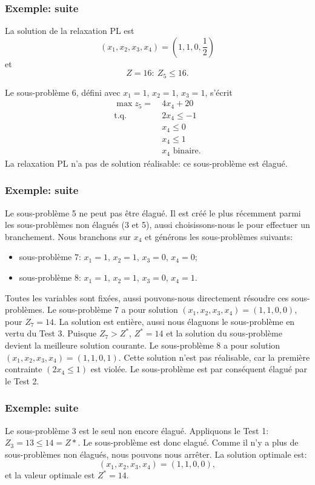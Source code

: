 \documentclass[usepdftitle=false]{beamer}
\def\st{\mbox{t.q. }}
\begin{document}
\begin{frame}
\frametitle{Exemple: suite}

La solution de la relaxation PL est
\[
( x_1, x_2, x_3, x_4) = \left(1,1,0, \frac{1}{2} \right)
\]
et
\[
Z = 16:\ Z_5 \leq 16.
\]

Le sous-problème 6, défini avec $x_1 = 1$, $x_2 = 1$, $x_3 = 1$, s'écrit
\begin{align*}
\max z_5 =\ & 4x_4 + 20 \\
\st{} & 2x_4 \leq -1 \\
& x_4 \leq 0 \\
& x_4 \leq 1 \\
& x_4 \mbox{ binaire}.
\end{align*}
La relaxation PL n'a pas de solution réalisable: ce sous-problème est élagué.

\end{frame}

\begin{frame}
\frametitle{Exemple: suite}

Le sous-problème 5 ne peut pas être élagué.
Il est créé le plus récemment parmi les sous-problèmes non élagués (3 et 5), aussi choisissons-nous le pour effectuer un branchement.
Nous branchons sur $x_4$ et générons les sous-problèmes suivants:
\begin{itemize}
\item
sous-problème 7: $x_1 = 1$, $x_2 = 1$, $x_3 = 0$, $x_4 = 0$;
\item
sous-problème 8: $x_1 = 1$, $x_2 = 1$, $x_3 = 0$, $x_4 = 1$.
\end{itemize}

\mbox{}

Toutes les variables sont fixées, aussi pouvons-nous directement résoudre ces sous-problèmes. 
Le sous-problème 7 a pour solution $(x_1, x_2, x_3, x_4) = (1, 1, 0, 0)$, pour $Z_7 = 14$.
La solution est entière, aussi nous élaguons le sous-problème en vertu du Test 3.
Puisque $Z_7 > Z^*$, $Z^* = 14$ et la solution du sous-problème devient la meilleure solution courante.
Le sous-problème 8 a pour solution $(x_1, x_2, x_3, x_4) = (1, 1, 0, 1)$.
Cette solution n'est pas réalisable, car la première contrainte $(2x_4 \leq 1)$ est violée.
Le sous-problème est par conséquent élagué par le Test 2.

\end{frame}

\begin{frame}
\frametitle{Exemple: suite}

Le sous-problème 3 est le seul non encore élagué.
Appliquons le Test 1: $Z_3 = 13 \leq 14 = Z*$.
Le sous-problème est donc elagué.
Comme il n'y a plus de sous-problèmes non élagués, nous pouvons nous arrêter.
La solution optimale est:
\[
(x_1, x_2, x_3, x_4) = (1,1,0,0),
\]
et la valeur optimale est $Z^* = 14$.

\end{frame}
\end{document}
